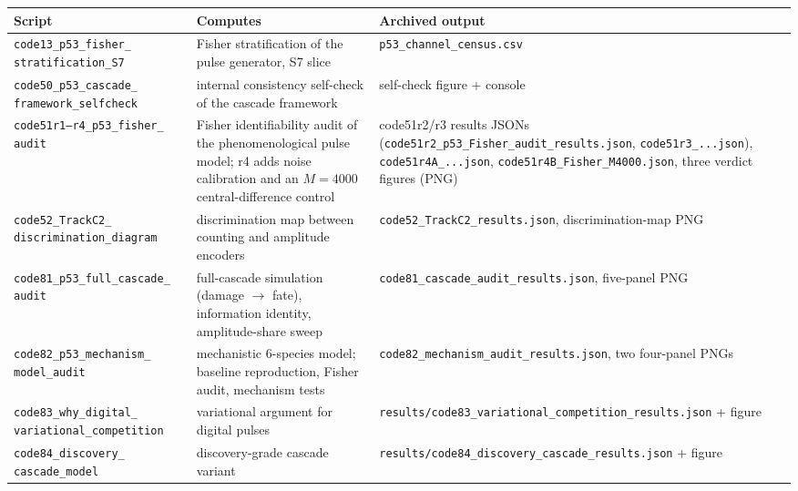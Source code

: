 \documentclass[11pt]{article}
\begin{document}
\begin{longtable}{p{4.6cm} p{6.6cm} p{4.6cm}}
\toprule
Script & Computes & Archived output \\
\midrule
\endhead
\texttt{code13\_\allowbreak{}p53\_\allowbreak{}fisher\_\allowbreak{} stratification\_\allowbreak{}S7} & Fisher stratification of the pulse generator, S7 slice & \texttt{p53\_\allowbreak{}channel\_\allowbreak{}census.csv} \\
\texttt{code50\_\allowbreak{}p53\_\allowbreak{}cascade\_\allowbreak{} framework\_\allowbreak{}selfcheck} & internal consistency self-check of the cascade framework & self-check figure + console \\
\texttt{code51r1--r4\_\allowbreak{}p53\_\allowbreak{}fisher\_\allowbreak{} audit} & Fisher identifiability audit of the phenomenological pulse model; r4 adds noise calibration and an $M{=}4000$ central-difference control & code51r2/r3 results JSONs (\texttt{code51r2\_\allowbreak{}p53\_\allowbreak{}Fisher\_\allowbreak{}audit\_\allowbreak{}results.json}, \texttt{code51r3\_\allowbreak{}...json}), \texttt{code51r4A\_\allowbreak{}...json}, \texttt{code51r4B\_\allowbreak{}Fisher\_\allowbreak{}M4000.json}, three verdict figures (PNG) \\
\texttt{code52\_\allowbreak{}TrackC2\_\allowbreak{} discrimination\_\allowbreak{}diagram} & discrimination map between counting and amplitude encoders & \texttt{code52\_\allowbreak{}TrackC2\_\allowbreak{}results.json}, discrimination-map PNG \\
\texttt{code81\_\allowbreak{}p53\_\allowbreak{}full\_\allowbreak{}cascade\_\allowbreak{} audit} & full-cascade simulation (damage $\to$ fate), information identity, amplitude-share sweep & \texttt{code81\_\allowbreak{}cascade\_\allowbreak{}audit\_\allowbreak{}results.json}, five-panel PNG \\
\texttt{code82\_\allowbreak{}p53\_\allowbreak{}mechanism\_\allowbreak{} model\_\allowbreak{}audit} & mechanistic 6-species model; baseline reproduction, Fisher audit, mechanism tests & \texttt{code82\_\allowbreak{}mechanism\_\allowbreak{}audit\_\allowbreak{}results.json}, two four-panel PNGs \\
\texttt{code83\_\allowbreak{}why\_\allowbreak{}digital\_\allowbreak{} variational\_\allowbreak{}competition} & variational argument for digital pulses & \texttt{results/code83\_\allowbreak{}variational\_\allowbreak{}competition\_\allowbreak{}results.json} + figure \\
\texttt{code84\_\allowbreak{}discovery\_\allowbreak{} cascade\_\allowbreak{}model} & discovery-grade cascade variant & \texttt{results/code84\_\allowbreak{}discovery\_\allowbreak{}cascade\_\allowbreak{}results.json} + figure \\

\end{longtable}
\end{document}
